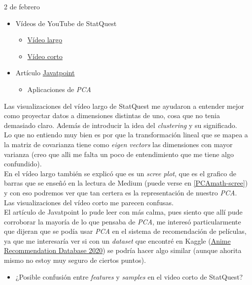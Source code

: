 \begin{entry}{2 de febrero}
\tcbsubtitle{\LBlimportant}
\begin{itemize}
    \item Vídeos de YouTube de StatQuest
    \begin{itemize}
        \item \href{https://youtu.be/FgakZw6K1QQ}{Vídeo largo}
        \item \href{https://youtu.be/HMOI_lkzW08}{Vídeo corto}
    \end{itemize}
    \item Artículo \href{https://www.javatpoint.com/principal-component-analysis#:~:text=Principal\%20Component\%20Analysis\%20is\%20an,the\%20help\%20of\%20orthogonal\%20transformation}{Javatpoint}
    \begin{itemize}
        \item Aplicaciones de \textit{PCA}
    \end{itemize}
\end{itemize}
\tcblower
\tcbsubtitle{\LBlsummary}
Las visualizaciones del vídeo largo de StatQuest me ayudaron a entender mejor como proyectar datos a dimensiones distintas de uno, cosa que no tenia demasiado claro. Además de introducir la idea del \textit{clustering} y su significado.\\

Lo que no entiendo muy bien es por que la transformación lineal que se mapea a la matriz de covarianza tiene como \textit{eigen vectors} las dimensiones con mayor varianza (creo que alli me falta un poco de entendimiento que me tiene algo confundido).\\

En el vídeo largo también se explicó que es un \textit{scree plot}, que es el grafico de barras que se enseñó en la lectura de Medium (puede verse en \ref{PCAmath-scree}) y con eso podremos ver que tan certera es la representación de nuestro \textit{PCA}.\\

Las visualizaciones del vídeo corto me parecen confusas.\\

El artículo de Javatpoint lo pude leer con más calma, pues siento que allí pude corroborar la mayoría de lo que pensaba de \textit{PCA}, me interesó particularmente que dijeran que se podía usar \textit{PCA} en el sistema de recomendación de películas, ya que me interesaría ver si con un \textit{dataset} que encontré en Kaggle (\href{https://www.kaggle.com/hernan4444/anime-recommendation-database-2020?select=anime.csv}{Anime Recommendation Database 2020}) se podría hacer algo similar (aunque ahorita mismo no estoy muy seguro de ciertos puntos).
\vspace{0.4em}
\tcbsubtitle{\LBltodo}\vspace{-1.25em}
\begin{itemize}
    \item ¿Posible confusión entre \textit{features} y \textit{samples} en el video corto de StatQuest?
\end{itemize}
\end{entry}


